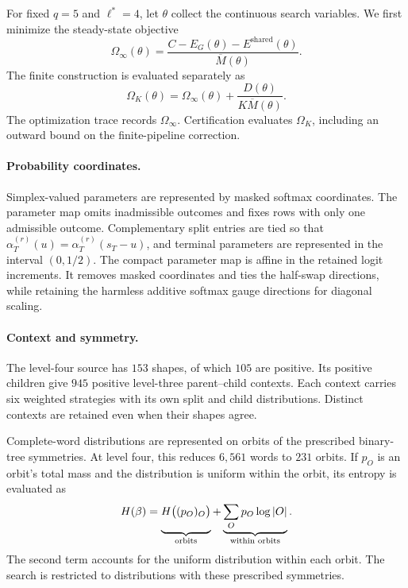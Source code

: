 \documentclass[11pt,a4paper]{article}
\newcommand{\Eshared}{E^{\mathrm{shared}}}
\newcommand{\Mbar}{\overline M}
\begin{document}
For fixed $q=5$ and $\ell^*=4$, let $\theta$ collect the continuous search variables. We first minimize the steady-state objective
\begin{equation}\label{eq:search-objective}
\Omega_\infty(\theta)=
\frac{C-E_G(\theta)-\Eshared(\theta)}{\Mbar(\theta)}.
\end{equation}
The finite construction is evaluated separately as
\begin{equation}\label{eq:finite-objective}
\Omega_K(\theta)=\Omega_\infty(\theta)+\frac{D(\theta)}{K\Mbar(\theta)}.
\end{equation}
The optimization trace records $\Omega_\infty$. Certification evaluates $\Omega_K$, including an outward bound on the finite-pipeline correction.

\paragraph{Probability coordinates.}
Simplex-valued parameters are represented by masked softmax coordinates. The parameter map omits inadmissible outcomes and fixes rows with only one admissible outcome. Complementary split entries are tied so that $\alpha_T^{(r)}(u)=\alpha_T^{(r)}(s_T-u)$, and terminal parameters are represented in the interval $(0,1/2)$. The compact parameter map is affine in the retained logit increments. It removes masked coordinates and ties the half-swap directions, while retaining the harmless additive softmax gauge directions for diagonal scaling.

\paragraph{Context and symmetry.}
The level-four source has $153$ shapes, of which $105$ are positive. Its positive children give $945$ positive level-three parent--child contexts. Each context carries six weighted strategies with its own split and child distributions. Distinct contexts are retained even when their shapes agree.

Complete-word distributions are represented on orbits of the prescribed binary-tree symmetries. At level four, this reduces $6{,}561$ words to $231$ orbits. If $p_O$ is an orbit's total mass and the distribution is uniform within the orbit, its entropy is evaluated as
\begin{equation}\label{eq:orbit-entropy}
H(\beta)=
\underbrace{H\bigl((p_O)_O\bigr)\vphantom{\sum_O p_O\log|O|}}_{\text{\upshape orbits}}
+\underbrace{\sum_O p_O\log|O|}_{\text{\upshape within orbits}}.
\end{equation}
The second term accounts for the uniform distribution within each orbit. The search is restricted to distributions with these prescribed symmetries.
\end{document}
